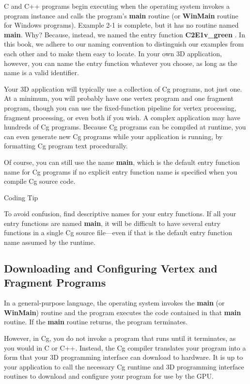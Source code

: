 \documentclass[../main.tex]{subfiles}
\begin{document}
C and C++ programs begin executing when the operating system invokes a program instance and calls the program's \textbf{main} routine (or \textbf{WinMain} routine for Windows programs). Example 2-1 is complete, but it has no routine named \textbf{main}. Why? Because, instead, we named the entry function \textbf{C2E1v_green} . In this book, we adhere to our naming convention to distinguish our examples from each other and to make them easy to locate. In your own 3D application, however, you can name the entry function whatever you choose, as long as the name is a valid identifier.

Your 3D application will typically use a collection of Cg programs, not just one. At a minimum, you will probably have one vertex program and one fragment program, though you can use the fixed-function pipeline for vertex processing, fragment processing, or even both if you wish. A complex application may have hundreds of Cg programs. Because Cg programs can be compiled at runtime, you can even generate new Cg programs while your application is running, by formatting Cg program text procedurally.

Of course, you can still use the name \textbf{main}, which is the default entry function name for Cg programs if no explicit entry function name is specified when you compile Cg source code.

\begin{framed}
Coding Tip

To avoid confusion, find descriptive names for your entry functions. If all your entry functions are named \textbf{main}, it will be difficult to have several entry functions in a single Cg source file—even if that is the default entry function name assumed by the runtime.
\end{framed}

\subsection{Downloading and Configuring Vertex and Fragment Programs}

In a general-purpose language, the operating system invokes the \textbf{main} (or \textbf{WinMain}) routine and the program executes the code contained in that \textbf{main} routine. If the \textbf{main} routine returns, the program terminates.

However, in Cg, you do not invoke a program that runs until it terminates, as you would in C or C++. Instead, the Cg compiler translates your program into a form that your 3D programming interface can download to hardware. It is up to your application to call the necessary Cg runtime and 3D programming interface routines to download and configure your program for use by the GPU.
\end{document}
